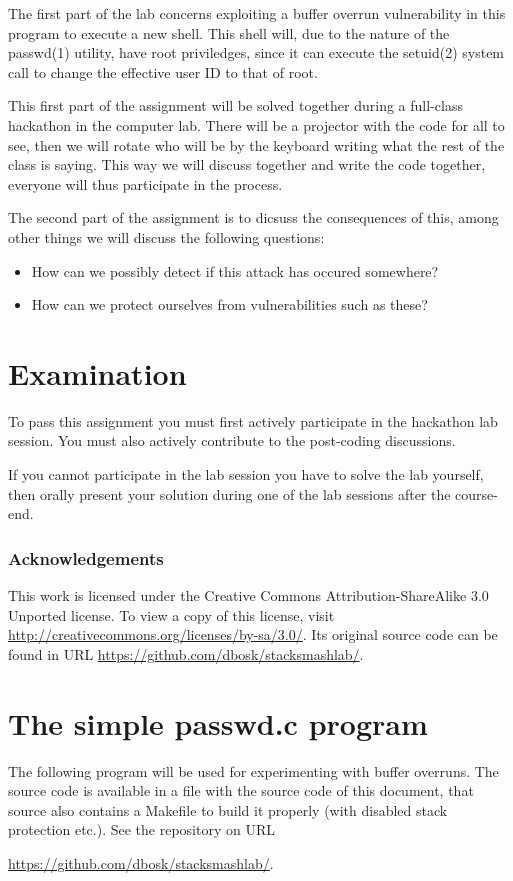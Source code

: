 The first part of the lab concerns exploiting a buffer overrun vulnerability in 
this program to execute a new shell.
This shell will, due to the nature of the passwd(1) utility, have root 
priviledges, since it can execute the setuid(2) system call to change the 
effective user ID to that of root.

This first part of the assignment will be solved together during a full-class 
hackathon in the computer lab.
There will be a projector with the code for all to see, then we will rotate who 
will be by the keyboard writing what the rest of the class is saying.
This way we will discuss together and write the code together, everyone will 
thus participate in the process.

The second part of the assignment is to dicsuss the consequences of this, among 
other things we will discuss the following questions:
\begin{itemize}
  \item How can we possibly detect if this attack has occured somewhere?
  \item How can we protect ourselves from vulnerabilities such as these?
\end{itemize}


\section{Examination}
\label{sec:exam}
To pass this assignment you must first actively participate in the hackathon 
lab session.
You must also actively contribute to the post-coding discussions.

If you cannot participate in the lab session you have to solve the lab 
yourself, then orally present your solution during one of the lab sessions 
after the course-end.


\subsubsection*{Acknowledgements}

This work is licensed under the Creative Commons Attribution-ShareAlike 3.0 
Unported license.
To view a copy of this license, visit 
\url{http://creativecommons.org/licenses/by-sa/3.0/}.
Its original source code can be found in URL 
\url{https://github.com/dbosk/stacksmashlab/}.


\printbibliography{}


\appendix
\section{The simple passwd.c program}
\label{app:passwdsrc}
The following program will be used for experimenting with buffer overruns.
The source code is available in a file with the source code of this document, 
that source also contains a Makefile to build it properly (with disabled stack 
protection etc.).
See the repository on URL
\begin{center}
  \url{https://github.com/dbosk/stacksmashlab/}.
\end{center}



